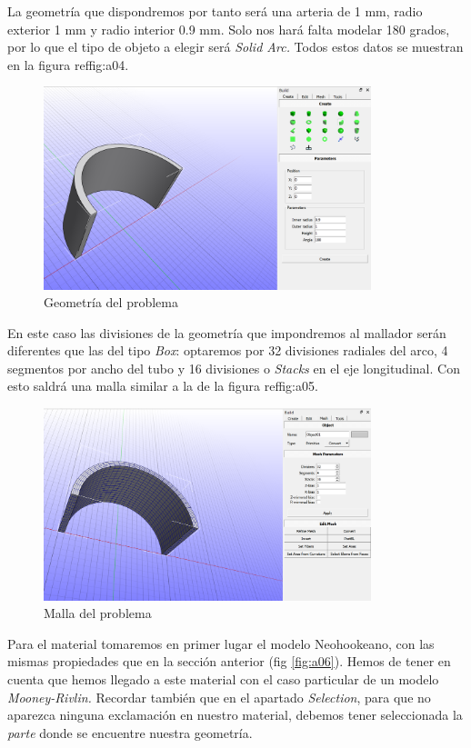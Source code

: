 La geometría que dispondremos por tanto será una arteria de 1 mm, radio exterior 1 mm y radio interior 0.9 mm. Solo nos hará falta modelar 180 grados, por lo que el tipo de objeto a elegir será \emph{Solid Arc.} Todos estos datos se muestran en la figura ref{fig:a04}.

\begin{figure}[!htp]
\centering
\includegraphics[width=0.85\textwidth]{figuras_3/a1.png}
\caption{Geometría del problema}
\label{fig:a04}
\end{figure}

En este caso las divisiones de la geometría que impondremos al mallador serán diferentes que las del tipo \emph{Box}: optaremos por 32 divisiones radiales del arco, 4 segmentos por ancho del tubo y 16 divisiones o \emph{Stacks} en el eje longitudinal. Con esto saldrá una malla similar a la de la figura ref{fig:a05}.

\begin{figure}[!htp]
\centering
\includegraphics[width=0.85\textwidth]{figuras_3/a2.png}
\caption{Malla del problema}
\label{fig:a05}
\end{figure}

Para el material tomaremos en primer lugar el modelo Neohookeano, con las mismas propiedades que en la sección anterior (fig \ref{fig:a06}). Hemos de tener en cuenta que hemos llegado a este material con el caso particular de un modelo \emph{Mooney-Rivlin.} Recordar también que en el apartado \emph{Selection}, para que no aparezca ninguna exclamación en nuestro material, debemos tener seleccionada la \emph{parte} donde se encuentre nuestra geometría.

